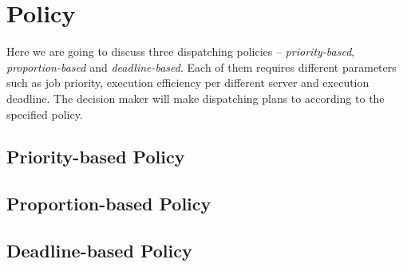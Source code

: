 \chapter{Policy}

Here we are going to discuss three dispatching policies --
\emph{priority-based}, \emph{proportion-based} and
\emph{deadline-based}.  Each of them requires different parameters such
as job priority, execution efficiency per different server and execution
deadline.  The decision maker will make dispatching plans to according
to the specified policy.

\section{Priority-based Policy}

\section{Proportion-based Policy}

\section{Deadline-based Policy}

